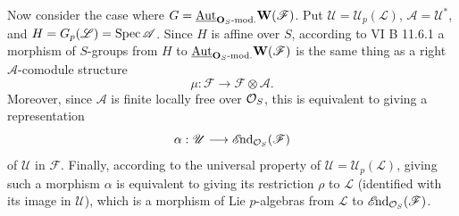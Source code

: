 Now consider the case where $G=\underline{\operatorname{Aut}}_{\mathbf O_S\text{-mod.}}\mathbf W(\mathscr F)$. Put $\mathscr U=\mathscr U_p(\mathscr L)$, $\mathscr A=\mathscr U^*$, and $H=G_p(\mathscr L)=\operatorname{Spec}\mathscr A$. Since $H$ is affine over $S$, according to VI B 11.6.1 a morphism of $S$-groups from $H$ to $\underline{\operatorname{Aut}}_{\mathbf O_S\text{-mod.}}\mathbf W(\mathscr F)$ is the same thing as a right $\mathscr A$-comodule structure
\[
\mu:\mathscr F\longrightarrow\mathscr F\otimes\mathscr A.
\]
Moreover, since $\mathscr A$ is finite locally free over $\mathcal{O}_S$, this is equivalent to giving a representation
\[
\alpha:\mathscr U\longrightarrow\mathscr E\!\mathrm{nd}_{\mathcal{O}_S}(\mathscr F)
\]
of $\mathscr U$ in $\mathscr F$. Finally, according to the universal property of $\mathscr U=\mathscr U_p(\mathscr L)$, giving such a morphism $\alpha$ is equivalent to giving its restriction $\rho$ to $\mathscr L$ (identified with its image in $\mathscr U$), which is a morphism of Lie $p$-algebras from $\mathscr L$ to $\mathscr E\!\mathrm{nd}_{\mathcal{O}_S}(\mathscr F)$.
